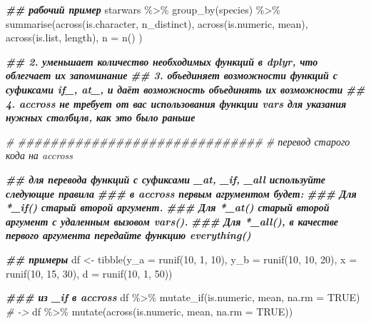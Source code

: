 \documentclass[
]{book}
\newenvironment{Shaded}{\begin{snugshade}}{\end{snugshade}}
\newcommand{\AttributeTok}[1]{\textcolor[rgb]{0.77,0.63,0.00}{#1}}
\newcommand{\CommentTok}[1]{\textcolor[rgb]{0.56,0.35,0.01}{\textit{#1}}}
\newcommand{\ConstantTok}[1]{\textcolor[rgb]{0.00,0.00,0.00}{#1}}
\newcommand{\DecValTok}[1]{\textcolor[rgb]{0.00,0.00,0.81}{#1}}
\newcommand{\DocumentationTok}[1]{\textcolor[rgb]{0.56,0.35,0.01}{\textbf{\textit{#1}}}}
\newcommand{\FunctionTok}[1]{\textcolor[rgb]{0.00,0.00,0.00}{#1}}
\newcommand{\NormalTok}[1]{#1}
\newcommand{\OtherTok}[1]{\textcolor[rgb]{0.56,0.35,0.01}{#1}}
\newcommand{\SpecialCharTok}[1]{\textcolor[rgb]{0.00,0.00,0.00}{#1}}
\begin{document}
\begin{Shaded}
\begin{Highlighting}[]
\DocumentationTok{\#\# рабочий пример}
\NormalTok{starwars }\SpecialCharTok{\%\textgreater{}\%} 
  \FunctionTok{group\_by}\NormalTok{(species) }\SpecialCharTok{\%\textgreater{}\%} 
  \FunctionTok{summarise}\NormalTok{(}\FunctionTok{across}\NormalTok{(is.character, n\_distinct), }
            \FunctionTok{across}\NormalTok{(is.numeric, mean), }
            \FunctionTok{across}\NormalTok{(is.list, length), }
            \AttributeTok{n =} \FunctionTok{n}\NormalTok{()}
\NormalTok{  )}

\DocumentationTok{\#\# 2. уменьшает количество необходимых функций в dplyr, что облегчает их запоминание}
\DocumentationTok{\#\# 3. объединяет возможности функций с суфиксами if\_, at\_, и даёт возможность объединять их возможности}
\DocumentationTok{\#\# 4. accross не требует от вас использования функции vars для указания нужных столбцлв, как это было раньше}

\CommentTok{\# \#\#\#\#\#\#\#\#\#\#\#\#\#\#\#\#\#\#\#\#\#\#\#\#\#\#\#\#\#\#}
\CommentTok{\# перевод старого кода на accross}

\DocumentationTok{\#\# для перевода функций с суфиксами \_at, \_if, \_all используйте следующие правила}
\DocumentationTok{\#\#\# в accross первым агрументом будет:}
\DocumentationTok{\#\#\# Для *\_if() старый второй аргумент.}
\DocumentationTok{\#\#\# Для *\_at() старый второй аргумент с удаленным вызовом vars().}
\DocumentationTok{\#\#\# Для *\_all(), в качестве первого аргумента передайте функцию everything()}

\DocumentationTok{\#\# примеры}
\NormalTok{df }\OtherTok{\textless{}{-}} \FunctionTok{tibble}\NormalTok{(}\AttributeTok{y\_a  =} \FunctionTok{runif}\NormalTok{(}\DecValTok{10}\NormalTok{, }\DecValTok{1}\NormalTok{, }\DecValTok{10}\NormalTok{),}
             \AttributeTok{y\_b  =} \FunctionTok{runif}\NormalTok{(}\DecValTok{10}\NormalTok{, }\DecValTok{10}\NormalTok{, }\DecValTok{20}\NormalTok{),}
             \AttributeTok{x    =} \FunctionTok{runif}\NormalTok{(}\DecValTok{10}\NormalTok{, }\DecValTok{15}\NormalTok{, }\DecValTok{30}\NormalTok{),}
             \AttributeTok{d    =} \FunctionTok{runif}\NormalTok{(}\DecValTok{10}\NormalTok{, }\DecValTok{1}\NormalTok{, }\DecValTok{50}\NormalTok{))}

\DocumentationTok{\#\#\# из \_if в accross}
\NormalTok{df }\SpecialCharTok{\%\textgreater{}\%} \FunctionTok{mutate\_if}\NormalTok{(is.numeric, mean, }\AttributeTok{na.rm =} \ConstantTok{TRUE}\NormalTok{)}
\CommentTok{\# {-}\textgreater{}}
\NormalTok{df }\SpecialCharTok{\%\textgreater{}\%} \FunctionTok{mutate}\NormalTok{(}\FunctionTok{across}\NormalTok{(is.numeric, mean, }\AttributeTok{na.rm =} \ConstantTok{TRUE}\NormalTok{))}


\end{Highlighting}
\end{Shaded}
\end{document}
